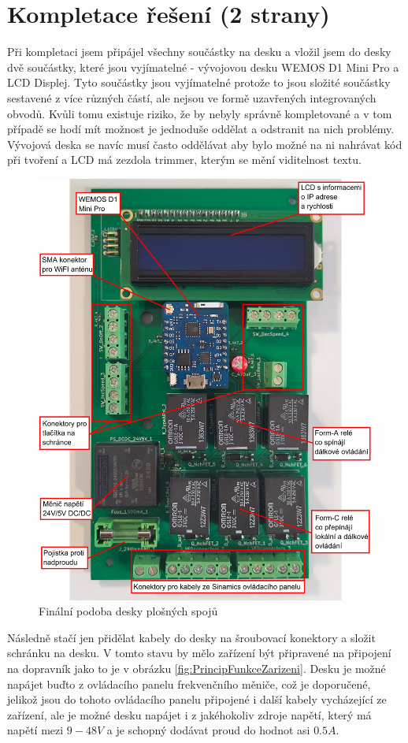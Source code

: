 \section{Kompletace řešení (2 strany)}

Při kompletaci jsem připájel všechny součástky na desku a vložil jsem do desky dvě součástky, které jsou vyjímatelné - vývojovou desku WEMOS D1 Mini Pro a LCD Displej. Tyto součástky jsou vyjímatelné protože to jsou složité součástky sestavené z více různých částí, ale nejsou ve formě uzavřených integrovaných obvodů. Kvůli tomu existuje riziko, že by nebyly správně kompletované a v tom případě se hodí mít možnost je jednoduše oddělat a odstranit na nich problémy. Vývojová deska se navíc musí často oddělávat aby bylo možné na ni nahrávat kód při tvoření a LCD má zezdola trimmer, kterým se mění viditelnost textu.

\begin{figure}[H]
    \centering
    \includegraphics[width=0.95\linewidth]{images/PCB_Final_annotated.jpg}
    \caption{Finální podoba desky plošných spojů}
    \label{fig:PCBFinal}
\end{figure}

Následně stačí jen přidělat kabely do desky na šroubovací konektory a složit schránku na desku. V tomto stavu by mělo zařízení být připravené na připojení na dopravník jako to je v obrázku \ref{fig:PrincipFunkceZarizeni}. Desku je možné napájet buďto z ovládacího panelu frekvenčního měniče, což je doporučené, jelikož jsou do tohoto ovládacího panelu připojené i další kabely vycházející ze zařízení, ale je možné desku napájet i z jakéhokoliv zdroje napětí, který má napětí mezi $9-48V$ a je schopný dodávat proud do hodnot asi $0.5A$.



